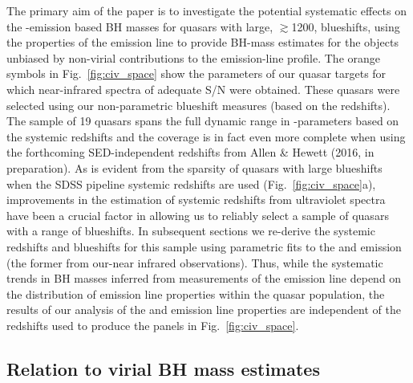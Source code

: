 The primary aim of the paper is to investigate the potential systematic effects on the -emission based BH masses for quasars with large, $\gtrsim$1200\kms,  blueshifts, using the properties of the \ha emission line to provide BH-mass estimates for the objects unbiased by non-virial contributions to the emission-line profile.
The orange symbols in Fig.~\ref{fig:civ_space} show the  parameters of our quasar targets for which near-infrared spectra of adequate S/N were obtained. 
These quasars were selected using our non-parametric blueshift measures (based on the \citet{hewett10} redshifts). 
The sample of 19 quasars spans the full dynamic range in -parameters based on the \citet{hewett10} systemic redshifts and the coverage is in fact even more complete when using the forthcoming SED-independent redshifts from Allen \& Hewett (2016, in preparation).
As is evident from the sparsity of quasars with large  blueshifts when the SDSS pipeline systemic redshifts are used (Fig.~\ref{fig:civ_space}a), improvements in the estimation of systemic redshifts from ultraviolet spectra have been a crucial factor in allowing us to reliably select a sample of quasars with a range of  blueshifts. 
In subsequent sections we re-derive the systemic redshifts and  blueshifts for this sample using parametric fits to the \ha and  emission (the former from our-near infrared observations). 
Thus, while the systematic trends in BH masses inferred from measurements of the  emission line depend on the distribution of  emission line properties within the quasar population, the results of our analysis of the \ha and  emission line properties are independent of the redshifts used to produce the panels in Fig.~\ref{fig:civ_space}.  

\subsection{Relation to virial BH mass estimates}
\label{sec:blueshiftmasses}

